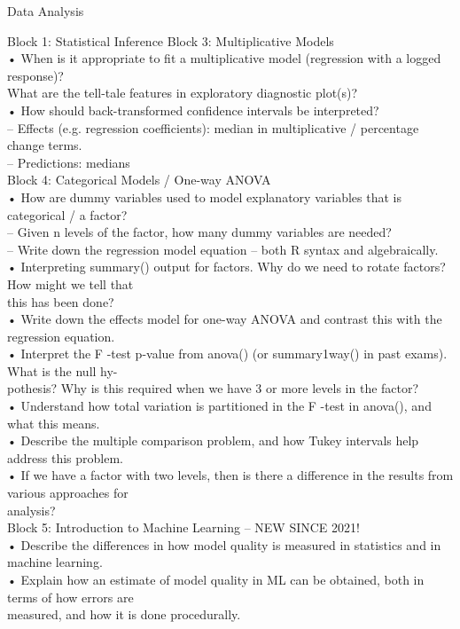 \documentclass[
  ignorenonframetext,
]{beamer}
\begin{document}
\begin{frame}{Data Analysis}
\begin{block}{Block 1: Statistical Inference}
Block 3: Multiplicative Models\\
• When is it appropriate to fit a multiplicative model (regression with
a logged response)?\\
What are the tell-tale features in exploratory diagnostic plot(s)?\\
• How should back-transformed confidence intervals be interpreted?\\
-- Effects (e.g. regression coefficients): median in multiplicative /
percentage change terms.\\
-- Predictions: medians\\
Block 4: Categorical Models / One-way ANOVA\\
• How are dummy variables used to model explanatory variables that is
categorical / a factor?\\
-- Given n levels of the factor, how many dummy variables are needed?\\
-- Write down the regression model equation -- both R syntax and
algebraically.\\
• Interpreting summary() output for factors. Why do we need to rotate
factors? How might we tell that\\
this has been done?\\
• Write down the effects model for one-way ANOVA and contrast this with
the regression equation.\\
• Interpret the F -test p-value from anova() (or summary1way() in past
exams). What is the null hy-\\
pothesis? Why is this required when we have 3 or more levels in the
factor?\\
• Understand how total variation is partitioned in the F -test in
anova(), and what this means.\\
• Describe the multiple comparison problem, and how Tukey intervals help
address this problem.\\
• If we have a factor with two levels, then is there a difference in the
results from various approaches for\\
analysis?\\
Block 5: Introduction to Machine Learning -- NEW SINCE 2021!\\
• Describe the differences in how model quality is measured in
statistics and in machine learning.\\
• Explain how an estimate of model quality in ML can be obtained, both
in terms of how errors are\\
measured, and how it is done procedurally.\\

\end{block}
\end{frame}
\end{document}
